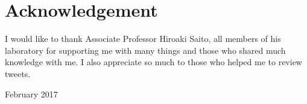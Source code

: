 \chapter*{Acknowledgement}
I would like to thank Associate Professor Hiroaki Saito, all members of his laboratory for supporting me with many things and those who shared much knowledge with me.
I also appreciate so much to those who helped me to review tweets.
\begin{flushright}
 February  2017
\end{flushright}


